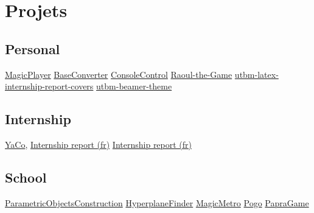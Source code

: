 \documentclass[10pt,a4paper,sans]{moderncv}
\begin{document}

	\vspace*{\deletedSpace}
	\section{Projets}
		\subsection{Personal}
				{\href{https://github.com/pinam45/MagicPlayer}{MagicPlayer}}
				{\href{https://github.com/pinam45/BaseConverter}{BaseConverter}}
				{\href{https://github.com/pinam45/ConsoleControl}{ConsoleControl}}
				{\href{https://github.com/TiWinDeTea/Raoul-the-Game}{Raoul-the-Game}}
				{\href{https://github.com/pinam45/utbm-latex-internship-report-covers}{utbm-latex-internship-report-covers}}
				{\href{https://github.com/pinam45/utbm-beamer-theme}{utbm-beamer-theme}}
		\subsection{Internship}
				{\href{https://github.com/DGA-MI-SSI/YaCo}{YaCo}, \href{https://github.com/pinam45/UTBM_ST40_Rapport_de_stage_DGA}{Internship report (fr)}}
				{\href{https://github.com/pinam45/UTBM_ST40_Rapport_de_stage_DGA}{Internship report (fr)}}
		\subsection{School}
				{\href{https://github.com/pinam45/UTBM\_IN55\_ParametricObjectsConstruction}{ParametricObjectsConstruction}}
				{\href{https://github.com/Lomadriel/HyperplaneFinder}{HyperplaneFinder}}
				{\href{https://github.com/TiWinDeTea/MagicMetro}{MagicMetro}}
				{\href{https://github.com/pinam45/UTBM_IA41_Pogo}{Pogo}}
				{\href{https://github.com/TiWinDeTea/PapraGame}{PapraGame}}
\end{document}
